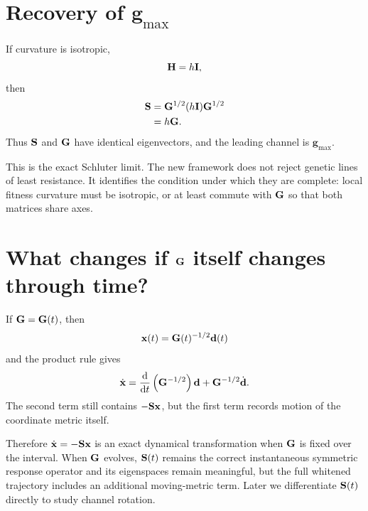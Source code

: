 \section{Recovery of \(\mathbf g_{\max}\)}

If curvature is isotropic,
\begin{equation}
\mathbf{H}=h\mathbf{I},
\end{equation}
then
\begin{align}
\mathbf{S}
&=\mathbf{G}^{1/2}(h\mathbf{I})\mathbf{G}^{1/2}\\
&=h\mathbf{G}.
\end{align}
Thus \(\mathbf{S}\) and \(\mathbf{G}\) have identical eigenvectors, and the leading channel is \(\mathbf g_{\max}\).

\begin{connectionbox}
This is the exact Schluter limit. The new framework does not reject genetic lines of least resistance. It identifies the condition under which they are complete: local fitness curvature must be isotropic, or at least commute with \(\mathbf{G}\) so that both matrices share axes.
\end{connectionbox}

\section{What changes if \(\mathbf{G}\) itself changes through time?}

If \(\mathbf{G}=\mathbf{G}(t)\), then
\begin{equation}
\mathbf x(t)=\mathbf{G}(t)^{-1/2}\mathbf d(t)
\end{equation}
and the product rule gives
\begin{equation}
\dot{\mathbf x}
=\frac{\mathrm d}{\mathrm d t}\left(\mathbf{G}^{-1/2}\right)\mathbf d
+\mathbf{G}^{-1/2}\dot{\mathbf d}.
\label{eq:timeVaryingWhitening}
\end{equation}
The second term still contains \(-\mathbf{S}\mathbf x\), but the first term records motion of the coordinate metric itself.

\begin{cautionbox}
Therefore \(\dot{\mathbf x}=-\mathbf{S}\mathbf x\) is an exact dynamical transformation when \(\mathbf{G}\) is fixed over the interval. When \(\mathbf{G}\) evolves, \(\mathbf{S}(t)\) remains the correct instantaneous symmetric response operator and its eigenspaces remain meaningful, but the full whitened trajectory includes an additional moving-metric term. Later we differentiate \(\mathbf{S}(t)\) directly to study channel rotation.
\end{cautionbox}
